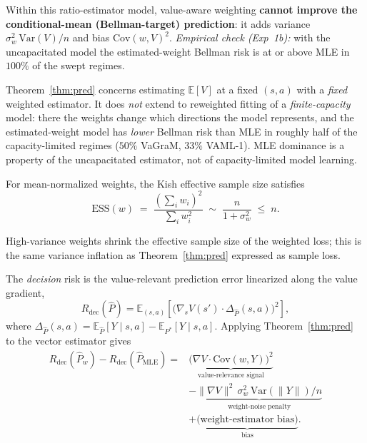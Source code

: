 \documentclass{article}
\theoremstyle{plain}
\begin{document}
Within this ratio-estimator model, value-aware weighting \textbf{cannot improve the
conditional-mean (Bellman-target) prediction}: it adds variance
$\sigma_w^2\,\mathrm{Var}(V)/n$ and bias $\mathrm{Cov}(w,V)^2$. \emph{Empirical check
(Exp~1b):} with the uncapacitated model the estimated-weight Bellman risk is at or above
MLE in $100\%$ of the swept regimes.

\begin{remark}
\label{rem:scope}
Theorem~\ref{thm:pred} concerns estimating $\mathbb{E}[V]$ at a fixed $(s,a)$ with a
\emph{fixed} weighted estimator. It does \emph{not} extend to reweighted fitting of a
\emph{finite-capacity} model: there the weights change which directions the model
represents, and the estimated-weight model has \emph{lower} Bellman risk than MLE in
roughly half of the capacity-limited regimes ($50\%$ VaGraM, $33\%$ VAML-1). MLE
dominance is a property of the uncapacitated estimator, not of capacity-limited model
learning.
\end{remark}

\begin{theorem}
\label{thm:ess}
For mean-normalized weights, the Kish effective sample size satisfies
\begin{equation}
  \mathrm{ESS}(w) \;=\; \frac{\left(\sum_i w_i\right)^2}{\sum_i w_i^2}
  \;\sim\; \frac{n}{1 + \sigma_w^2} \;\le\; n.
\end{equation}
\end{theorem}

High-variance weights shrink the effective sample size of the weighted loss; this is the
same variance inflation as Theorem~\ref{thm:pred} expressed as sample loss.

\begin{theorem}
\label{thm:crossover}
The \emph{decision} risk is the value-relevant prediction error linearized along the
value gradient,
\begin{equation}
  R_{\mathrm{dec}}(\hat{P})
    = \mathbb{E}_{(s,a)}\!\left[
      \bigl( \nabla_s V(s') \cdot \Delta_{\hat{P}}(s,a) \bigr)^2
    \right],
\end{equation}
where $\Delta_{\hat{P}}(s,a) = \mathbb{E}_{\hat{P}}[Y \mid s,a] - \mathbb{E}_{P^*}[Y \mid s,a]$.
Applying Theorem~\ref{thm:pred} to the vector estimator gives
\begin{equation}
\begin{aligned}
  R_{\mathrm{dec}}(\hat{P}_w) - R_{\mathrm{dec}}(\hat{P}_{\mathrm{MLE}})
  ={}& \underbrace{\bigl(\nabla V \cdot \mathrm{Cov}(w, Y)\bigr)^2}
        _{\text{value-relevance signal}} \\
      &- \underbrace{\lVert \nabla V\rVert^2\, \sigma_w^2\,
        \mathrm{Var}(\lVert Y\rVert)/n}_{\text{weight-noise penalty}} \\
      &+ \underbrace{\text{(weight-estimator bias)}}_{\text{bias}}.
\end{aligned}
\end{equation}
\end{theorem}
\end{document}
